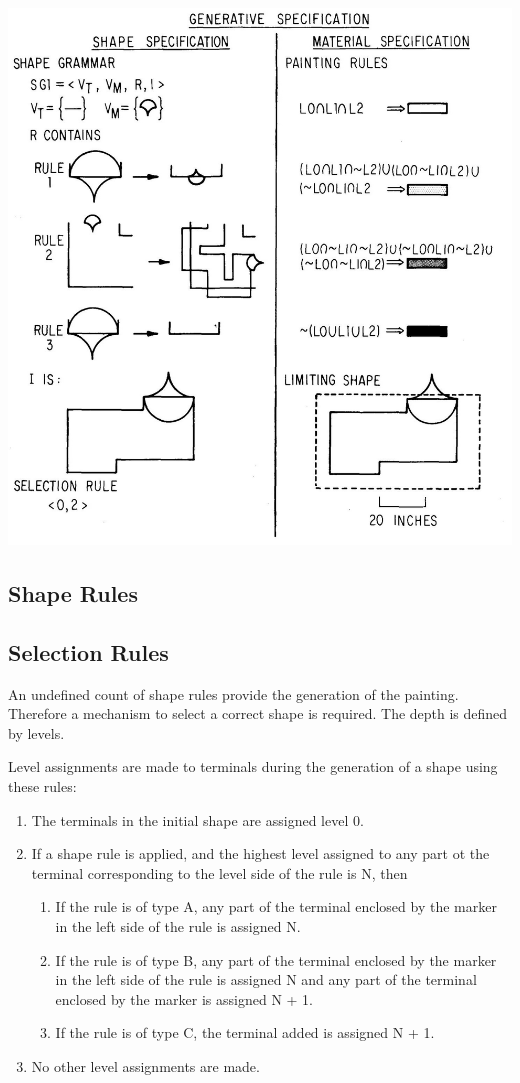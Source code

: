 \documentclass[11pt, a4paper]{report}
\begin{document}
\includegraphics{generativ_specification}
\subsection{Shape Rules}


\subsection{Selection Rules}
An undefined count of shape rules provide the generation of the painting. Therefore a mechanism to select a correct shape is required. The depth is defined by levels.
\begin{displayquote}
	Level assignments are made to terminals during the generation of a shape using these rules:
	\begin{enumerate}
		\item The terminals in the initial shape are assigned level 0.
		\item If a shape rule is applied, and the highest level assigned to any part ot the terminal corresponding to the level side of the rule is N, then
		\begin{enumerate}
			\item If the rule is of type A, any part of the terminal enclosed by the marker in the left side of the rule is assigned N.
			\item If the rule is of type B, any part of the terminal enclosed by the marker in the left side of the rule is assigned N and any part of the terminal enclosed by the marker is assigned N + 1.
			\item If the rule is of type C, the terminal added is assigned N + 1.
		\end{enumerate}
		\item No other level assignments are made.
	\end{enumerate}
\end{displayquote}
\end{document}
